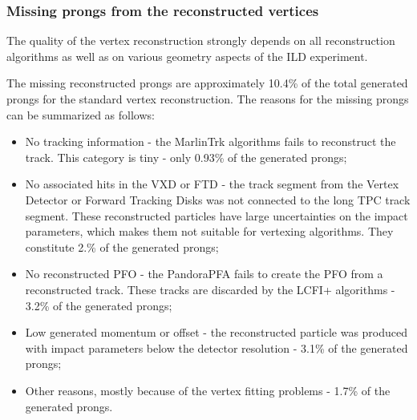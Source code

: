 \subsubsection{Missing prongs from the reconstructed vertices}
\label{sec:MissingProngs}
The quality of the vertex reconstruction strongly depends on all reconstruction algorithms as well as on various geometry aspects of the ILD experiment. 

The missing reconstructed prongs are approximately 10.4\% of the total generated prongs for the standard vertex reconstruction. 
The reasons for the missing prongs can be summarized as follows:
\begin{itemize}
\item No tracking information - the MarlinTrk algorithms fails to reconstruct the track. This category is tiny - only 0.93\% of the generated prongs;
\item No associated hits in the VXD or FTD - the track segment from the Vertex Detector or Forward Tracking Disks was not connected to the long TPC track segment. These reconstructed particles have large uncertainties on the impact parameters, which makes them not suitable for vertexing algorithms. They constitute 2.\% of the generated prongs;
\item No reconstructed PFO - the PandoraPFA fails to create the PFO from a reconstructed track. These tracks are discarded by the LCFI+ algorithms - 3.2\%  of the generated prongs;
\item Low generated momentum or offset  - the reconstructed particle was produced with impact parameters below the detector resolution - 3.1\%  of the generated prongs;
\item Other reasons, mostly because of the vertex fitting problems - 1.7\% of the generated prongs.
\end{itemize}



